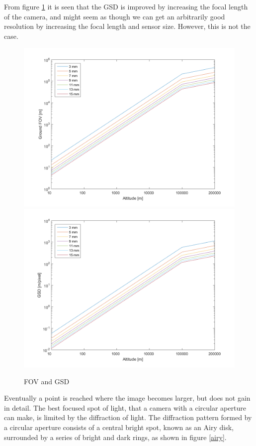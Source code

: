 From figure \ref{cameramatlab} it is seen that the GSD is improved by increasing the focal length of the camera, and might seem as though we can get an arbitrarily good resolution by increasing the focal length and sensor size. However, this is not the case. 
\begin{figure}
\begin{center}
\includegraphics[scale=0.5]{figures/FOV.png}
\includegraphics[scale=0.5]{figures/GSD.png}
\caption{FOV and GSD}
\label{cameramatlab}
\end{center}
\end{figure}

Eventually a point is reached where the image becomes larger, but does not gain in detail. The best focused spot of light, that a camera with a circular aperture can make, is limited by the diffraction of light. The diffraction pattern formed by a circular aperture consists of a central bright spot, known as an Airy disk, surrounded by a series of bright and dark rings, as shown in figure \ref{airy}.

